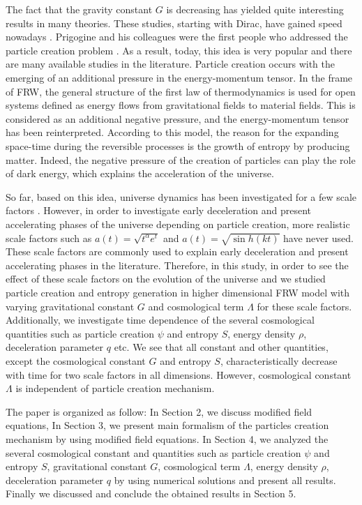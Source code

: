 \documentclass[superscriptaddress,showpacs,pre,twocolumn]{revtex4-1}
\begin{document}
The fact that the gravity constant $G$ is decreasing has yielded quite interesting results in many theories.  
These studies, starting with Dirac, have gained speed nowadays \cite{Dirac1937,Brans1961}. Prigogine and his colleagues were the first people who addressed the particle creation problem \cite{Prigogine1988,Prigogine1989}. As a result, today, this idea is very popular and there are many available studies in the literature. Particle creation occurs with the emerging of an additional pressure in the energy-momentum tensor. In the frame of FRW, the general structure of the first law of thermodynamics is used for open systems defined as energy flows from gravitational fields to material fields. This is considered as an additional negative pressure, and the energy-momentum tensor has been reinterpreted. According to this model, the reason for the expanding space-time during the reversible processes is the growth of entropy by producing matter. Indeed, the negative pressure of the creation of particles can play the role of dark energy, which explains the acceleration of the universe. 

So far, based on this idea, universe dynamics has been investigated for a few scale factors \cite{Singh2012,Calvao1992,Alcaniz1999,Lima2008,Steigman2009}. However, in order to investigate early deceleration and present accelerating phases of the universe depending on particle creation, more realistic scale factors such as $a(t)=\sqrt{t^{\alpha}e^{t}}$ and $a(t)=\sqrt{\sin h(kt)}$ have never used. These scale factors are commonly used to explain early deceleration and present accelerating phases in the literature. Therefore, in this study, in order to see the effect of these scale factors on the evolution of the universe and we studied particle creation and entropy generation in higher dimensional FRW model with varying gravitational constant $G$ and cosmological term $\Lambda$ for these scale factors. Additionally, we investigate time dependence of the several cosmological quantities such as particle creation $\psi$ and entropy $S$, energy density $\rho$, deceleration parameter $q$ etc. We see that all constant and other quantities, except the cosmological constant $G$ and entropy $S$, characteristically decrease with time for two scale factors in all dimensions. However, cosmological constant $\Lambda$ is independent of particle creation mechanism.

The paper is organized as follow: In Section 2, we discuss modified field equations, In Section 3, we present main formalism of the particles creation mechanism by using modified field equations. In Section 4, we analyzed the several cosmological constant and quantities such as particle creation $\psi$ and entropy $S$, gravitational constant $G$, cosmological term $\Lambda$, energy density $\rho$, deceleration parameter $q$ by using numerical solutions and present all results. Finally we discussed and conclude the obtained results in Section 5. 
\end{document}
